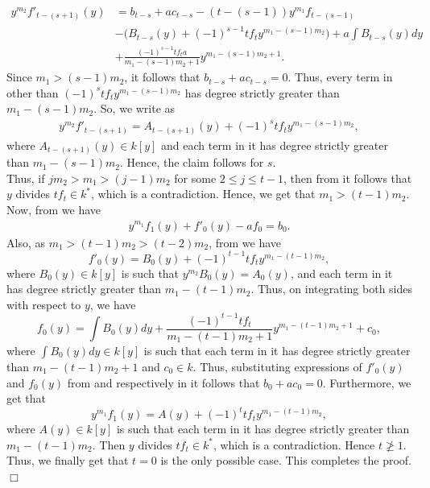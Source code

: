 \documentclass[12pt,reqno]{amsart}
\renewcommand{\leq}{\leqslant}
\numberwithin{thm}{section}
\theoremstyle{definition}
\numberwithin{equation}{thm}
\renewenvironment{proof}{\par\noindent {\em Proof:}}{\hfill$\Box$\medskip}
\theoremstyle{plain}
\begin{document}
\begin{proof}
	\begin{align}\label{eqn10-old}
		y^{m_2}f'_{t-(s+1)}(y)&=b_{t-s}+ac_{t-s}-(t-(s-1))y^{m_1}f_{t-(s-1)} \nonumber\\
        &-\bigg(B_{t-s}(y)+(-1)^{s-1}tf_ty^{m_1-(s-1)m_2}\bigg)+a\int B_{t-s}(y)dy \nonumber\\
        &+\frac{(-1)^{s-1}tf_ta}{m_1-(s-1)m_2+1}y^{m_1-(s-1)m_2+1}.
	\end{align}
	Since $m_1>(s-1)m_2$, it follows that $b_{t-s}+ac_{t-s}=0$. Thus, every term in  other than $(-1)^{s}tf_ty^{m_1-(s-1)m_2}$ has degree strictly greater than $m_1-(s-1)m_2.$ So, we write  as
	\begin{align}\label{eqn11-old}
		y^{m_2}f'_{t-(s+1)}=A_{t-(s+1)}(y)+(-1)^{s}tf_ty^{m_1-(s-1)m_2},
	\end{align}
	where $A_{t-(s+1)}(y)\in k[y]$ and each term in it has degree strictly greater than $m_1-(s-1)m_2$. 
	Hence, the claim follows for $s$.\\
    Thus, if $jm_2>m_1>(j-1)m_2$ for some $2\leq j\leq t-1$, then from  it follows that $y$ divides $tf_t\in k^{\ast}$, which  is a contradiction. Hence, we get that $m_1>(t-1)m_2$. Now, from  we have 
	\begin{align}\label{eqn12}
		y^{m_1}f_1(y)+f'_0(y)-af_0=b_0. 
	\end{align}
	Also, as $m_1>(t-1)m_2>(t-2)m_2$, from  we have 
	\begin{equation}\label{eqn13}
		f'_0(y)=B_0(y)+(-1)^{t-1}tf_ty^{m_1-(t-1)m_2},
	\end{equation}
	where $B_0(y)\in k[y]$ is such that $y^{m_2}B_0(y)=A_0(y)$, and each term in it has degree strictly greater than $m_1-(t-1)m_2$. Thus, on integrating  both sides with respect to $y$, we have
	\begin{equation}\label{eqn14}
		f_0(y)=\int B_0(y)dy+\frac{(-1)^{t-1}tf_t}{m_1-(t-1)m_2+1}y^{m_1-(t-1)m_2+1}+c_0,
	\end{equation} where $\int B_0(y)dy\in k[y]$ is such that each term in it has degree strictly greater than $m_1-(t-1)m_2+1$ and $c_0\in k$. Thus,
	substituting expressions of $f'_0(y)$ and $f_0(y)$ from  and  respectively in  it follows that $b_0+ac_0=0$. Furthermore, we get that 
	\begin{equation}
		y^{m_1}f_1(y)=A(y)+(-1)^{t}tf_ty^{m_1-(t-1)m_2},
	\end{equation} where $A(y)\in k[y]$ is such that each term in it has degree strictly greater than $m_1-(t-1)m_2$.
	Then $y$ divides $tf_t\in k^{\ast}$, which is a contradiction. Hence $t\ngeq 1$. Thus, we finally get that $t=0$ is the only possible case. This completes the proof.  
\end{proof}
\end{document}
